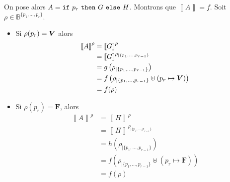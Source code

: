 \begin{enumerate}
\begin{itemize}
				On pose alors $A = {\tt if}\/\ p_r\ {\tt then}\/\ G\ {\tt else}\/\ H$. Montrons que $\left\llbracket A \right\rrbracket = f$. Soit $\rho \in \mathds{B}^{\{p_1,\ldots,p_r\}}$.
				\begin{itemize}
					\item Si $\rho(p_r) = {\bm{V}}$\/ alors
						\begin{align*}
							\left\llbracket A \right\rrbracket^\rho &=  \left\llbracket G \right\rrbracket^\rho\\
							&= \left\llbracket G \right\rrbracket^{\rho_{|\{p_1,\ldots,p_{r-1}\}}}\\
							&= g\left(\rho_{|\{p_1, \ldots, p_{r-1}\}}\right) \\
							&= f\left( \rho_{|\{p_1,\ldots,p_{r-1}\}} \uplus (p_r \mapsto {\bm{V}}) \right) \\
							&= f(\rho) \\
						\end{align*}
					\item Si $\rho(p_r) = \mathbf{F}$, alors
						\begin{align*}
							\left\llbracket A \right\rrbracket^\rho &= \left\llbracket H \right\rrbracket^\rho \\
							&= \left\llbracket H \right\rrbracket^{\rho_{|\{p_1,\ldots,p_{r-1}\}}} \\
							&= h\left( \rho_{|\{p_1,\ldots,p_{r-1}\}} \right) \\
							&= f\left(\rho_{|\{p_1,\ldots,p_{r-1}\}}\uplus (p_r \mapsto \mathbf{F})\right) \\
							&= f(\rho) \\
						\end{align*}
				\end{itemize}
		\end{itemize}
\end{enumerate}

